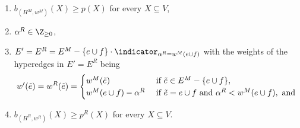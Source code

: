 \begin{lemma}
\begin{enumerate}[label=(\arabic*)]
        \item $b_{(H^M, w^M)}(X) \geq p(X)$ for every $X \subseteq V$,
        \item $\alpha^R \in \Z_{\geq 0}$, 
        \item 
        $E' = E^R = E^M - \{e\cup f\}\cdot \indicator_{\alpha^R=w^M(e\cup f)}$ with the weights of the hyperedges in $E' = E^R$ being 
        \[
        w'(\Tilde{e}) = w^R(\Tilde{e})=
        \begin{cases}
            w^M(\Tilde{e}) &\text { if } \Tilde{e}\in E^M-\{e\cup f\},\\
            w^M(e\cup f) - \alpha^R &\text { if } \Tilde{e}=e\cup f \text{ and } \alpha^R< w^M(e\cup f), \text{ and}  \\
        \end{cases}
        \]
        \item $b_{(H^R, w^R)}(X) \geq p^R(X)$ for every $X \subseteq V$. 
    \end{enumerate}
\end{lemma}
